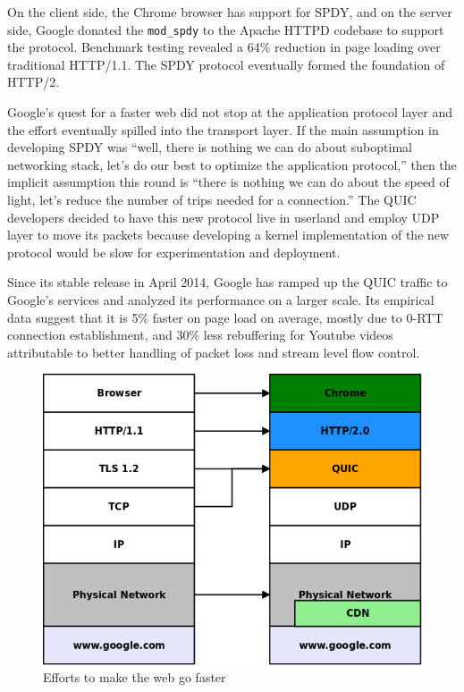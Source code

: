 \documentclass{sig-alternate-05-2015}
\begin{document}
On the client side, the Chrome browser has support for SPDY, and on the server side, Google donated the \texttt{mod\_spdy} to the Apache HTTPD codebase to support the protocol. Benchmark testing revealed a 64\% reduction in page loading over traditional HTTP/1.1. The SPDY protocol eventually formed the foundation of HTTP/2.

Google's quest for a faster web did not stop at the application protocol layer and the effort eventually spilled into the transport layer. If the main assumption in developing SPDY was ``well, there is nothing we can do about suboptimal networking stack, let's do our best to optimize the application protocol,'' then the implicit assumption this round is ``there is nothing we can do about the speed of light, let's reduce the number of trips needed for a connection.'' The QUIC developers decided to have this new protocol live in userland and employ UDP layer to move its packets because developing a kernel implementation of the new protocol would be slow for experimentation and deployment. 

Since its stable release in April 2014, Google has ramped up the QUIC traffic to Google's services and analyzed its performance on a larger scale. Its empirical data suggest that it is 5\% faster on page load on average, mostly due to 0-RTT connection establishment, and 30\% less rebuffering for Youtube videos attributable to better handling of packet loss and stream level flow control.\cite{quic:presentation}

\begin{figure}[bh]
\centering
\includegraphics[scale=0.27]{web.png}
\caption{Efforts to make the web go faster}
\label{fig:webstack}
\end{figure}
\end{document}
